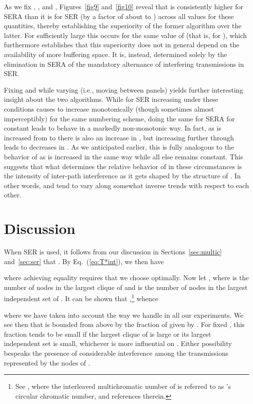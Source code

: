 \documentclass{article}
\begin{document}
As we fix , , and , Figures~\ref{fig9} and~\ref{fig10} reveal
that  is consistently higher for SERA than it is for SER (by a
factor of about  to ) across all values for these quantities, thereby
establishing the superiority of the former algorithm over the latter. For
sufficiently large  this occurs for the same value of  (that is, for
), which furthermore establishes that this superiority does not in general
depend on the availability of more buffering space. It is, instead, determined
solely by the elimination in SERA of the mandatory alternance of interfering
transmissions in SER.

Fixing  and  while varying  (i.e., moving between panels) yields
further interesting insight about the two algorithms. While for SER increasing
 under these conditions causes  to increase
monotonically (though sometimes almost imperceptibly) for the same numbering
scheme, doing the same for SERA for constant  leads  to
behave in a markedly non-monotonic way. In fact, as  is increased from
 to  there is also an increase in , but increasing
 further through  leads to decreases in .
As we anticipated earlier, this is fully analogous to the behavior of 
as  is increased in the same way while all else remains constant. This
suggests that what determines the relative behavior of  in
these circumstances is the intensity of inter-path interference as it gets
shaped by the structure of . In other words,  and 
tend to vary along somewhat inverse trends with respect to each other.

\section{Discussion}\label{sec:disc}

When SER is used, it follows from our discussion in Sections~\ref{sec:multic}
and~\ref{sec:ser} that . By
Eq.~(\ref{eq:T*int}), we then have

where achieving equality requires that we choose  optimally. Now let
, where  is the
number of nodes in the largest clique of  and  is the number of
nodes in the largest independent set of . It can be shown that
,\footnote{See \cite{l03}, where the
interleaved multichromatic number of  is referred to as 's circular
chromatic number, and references therein.} whence

where we have taken into account the way we handle  in all our experiments.
We see then that  is bounded from above by the fraction of
 given by . For fixed , this fraction tends to be
small if the largest clique of  is large or its largest independent set is
small, whichever is more influential on . Either possibility
bespeaks the presence of considerable interference among the transmissions
represented by the  nodes of .
\end{document}
